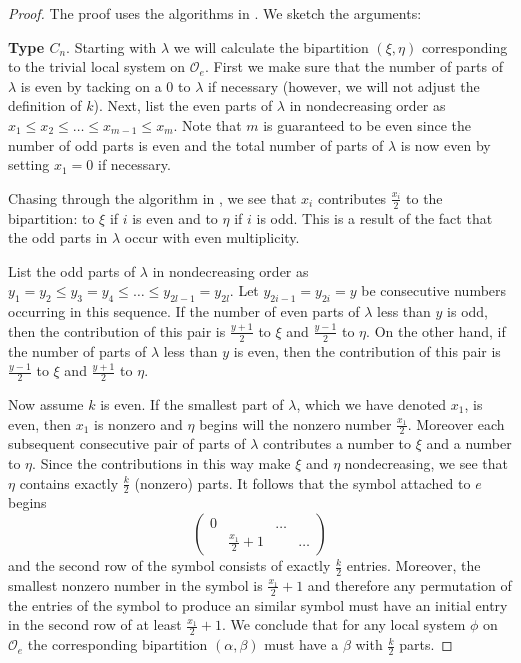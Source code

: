 \documentclass[10pt]{amsart}
\newcommand{\orbit}{\mathcal O}
\theoremstyle{plain}
\theoremstyle{definition}
\theoremstyle{remark}
\begin{document}
\begin{proof}
The proof uses the algorithms in \cite[Chapter 13.3]{carter:book}.   We sketch the arguments:

\medskip

\textbf{Type $C_n$}.   Starting with $\lambda$ we will calculate the bipartition $(\xi, \eta)$ corresponding to the trivial local system on $\orbit_e$.
First we make sure that the number of parts of $\lambda$ is even by tacking on a $0$ to $\lambda$ if necessary (however, we will not adjust  
the definition of $k$).
Next, list the even parts of $\lambda$ in nondecreasing order as $x_1 \leq x_2 \leq \dots \leq x_{m-1} \leq x_{m}$.  Note that $m$ is guaranteed to be even since the number of odd parts is even and the total number of parts of $\lambda$ is now even by setting $x_1 = 0$ if necessary.

Chasing through the algorithm in \cite{carter:book}, we see that $x_i$ contributes 
$\frac{x_i}{2}$ to the bipartition: to $\xi$ if $i$ is even and to $\eta$ if $i$ is odd.   This is a result of 
the fact that the odd parts in $\lambda$ occur with even multiplicity.

List the odd parts of $\lambda$ in nondecreasing order as $y_1 = y_2 \leq y_3 = y_4 \leq \dots \leq y_{2l-1} = y_{2l}$.
Let $y_{2i-1} = y_{2i} = y$ be consecutive numbers occurring in this sequence.
If the number of even parts of $\lambda$ less than $y$ is odd, then
the contribution of this pair is $\frac{y+1}{2}$ to $\xi$ and $\frac{y-1}{2}$ to $\eta$.
On the other hand, if the number of parts of $\lambda$ less than $y$ is even, then
the contribution of this pair is $\frac{y-1}{2}$ to $\xi$ and $\frac{y+1}{2}$ to $\eta$.

Now assume $k$ is even.  If the smallest part of $\lambda$, which we have denoted $x_1$, is even, then $x_1$ is nonzero and $\eta$ begins will the nonzero number $\frac{x_1}{2}$.  Moreover each subsequent consecutive pair of parts of $\lambda$ contributes a number to $\xi$ and a number to $\eta$.  Since the contributions in this way make $\xi$ and $\eta$ nondecreasing, we see that $\eta$ contains exactly $\frac{k}{2}$ (nonzero) parts.
It follows that the symbol attached to $e$ begins  %
$$\begin{pmatrix}
     0  & & \dots \\
       & \frac{x_1}{2} + 1 &&\dots 
     \end{pmatrix}$$
and the second row of the symbol consists of exactly $\frac{k}{2}$ entries.
Moreover, the smallest nonzero number in the symbol is $\frac{x_1}{2} + 1$ and therefore any permutation of the entries of the symbol to produce an similar symbol must have an initial entry in the second row of at least $\frac{x_1}{2}+1$.  
We conclude that for any local system $\phi$ on $\orbit_e$ the corresponding bipartition $(\alpha, \beta)$ must have a $\beta$ with $\frac{k}{2}$ parts.


\end{proof}
\end{document}
